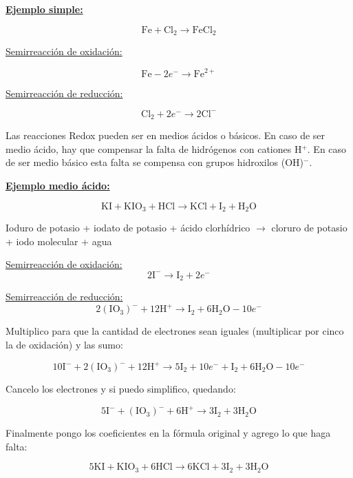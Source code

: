 \noindent\textbf{\underline{Ejemplo simple:}}

$$\text{Fe} + \text{Cl}_2 \longrightarrow \text{FeCl}_2$$

\begin{multicols}{2}

\underline{Semirreacción de oxidación:}

$$\text{Fe} - 2e^- \longrightarrow \text{Fe}^{2+}$$

\underline{Semirreacción de reducción:}

$$\text{Cl}_2 + 2e^- \longrightarrow 2\text{Cl}^{-} $$

\end{multicols}

Las reacciones Redox pueden ser en medios ácidos o básicos. En caso de ser medio ácido, hay que compensar la falta de hidrógenos con cationes H$^+$. En caso de ser medio básico esta falta se compensa con grupos hidroxilos (OH)$^-$.

\skipline
\noindent\textbf{\underline{Ejemplo medio ácido:}}

$$\text{KI} + \text{K} \text{I} \text{O}_3 + \text{H} \text{Cl} \longrightarrow
\text{KCl} + \text{I}_2 +  \text{H}_2 \text{O}$$

\hfil Ioduro de potasio \hfil + \hfil iodato de potasio \hfil + \hfil ácido clorhídrico \hfil
$\rightarrow$ \hfil
cloruro de potasio \hfil + \hfil iodo molecular \hfil + \hfil agua \hfil 

\begin{multicols}{2}

\underline{Semirreacción de oxidación:}
$$2\text{I}^{-} \longrightarrow \text{I}_2 + 2e^-$$

\underline{Semirreacción de reducción:}
$$2(\text{IO}_3)^{-} + 12 \text{H}^+ \longrightarrow \text{I}_2 + 6\text{H}_2 \text{O} - 10e^-$$
\end{multicols}

Multiplico para que la cantidad de electrones sean iguales (multiplicar por cinco la de oxidación) y las sumo:

$$10\text{I}^{-} + 2(\text{IO}_3)^{-} + 12 \text{H}^+ \longrightarrow 5 \text{I}_2 + 10 e^- + \text{I}_2 + 6\text{H}_2 \text{O} - 10e^-$$

Cancelo los electrones y si puedo simplifico, quedando:

$$5\text{I}^{-} + (\text{IO}_3)^{-} + 6 \text{H}^+ \longrightarrow 3 \text{I}_2 + 3\text{H}_2 \text{O}$$

Finalmente pongo los coeficientes en la fórmula original y agrego lo que haga falta:

$$5\text{KI} + \text{K} \text{I} \text{O}_3 + 6\text{H} \text{Cl} \longrightarrow
6\text{KCl} + 3\text{I}_2 +  3\text{H}_2 \text{O}$$

